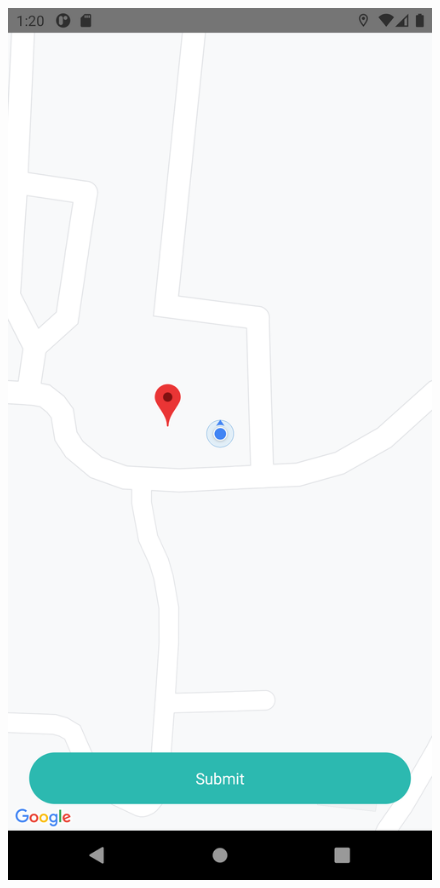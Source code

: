 \documentclass{article}
\begin{document}
        \begin{figure}
            \centering
            \begin{minipage}{.5\textwidth}
                \centering
                \includegraphics[scale=0.1]{app_home}

\end{minipage}
\end{figure}
\end{document}
